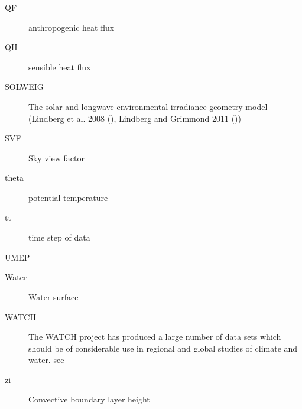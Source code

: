 \documentclass[letterpaper,10pt,english]{sphinxmanual}
\begin{document}
\begin{description}
\item[{QF}] \leavevmode{}\label{\detokenize{notation:term-qf}}
anthropogenic  heat flux

\item[{QH}] \leavevmode{}\label{\detokenize{notation:term-qh}}
sensible heat  flux

\item[{SOLWEIG}] \leavevmode{}\label{\detokenize{notation:term-solweig}}
The solar and longwave environmental irradiance geometry model
(Lindberg et al. 2008 \label{\detokenize{notation:id8}}{\hyperref[\detokenize{references:fl2008}]{\sphinxcrossref{{[}FL2008{]}}}} (),   Lindberg and Grimmond 2011 \label{\detokenize{notation:id9}}{\hyperref[\detokenize{references:fl2011}]{\sphinxcrossref{{[}FL2011{]}}}} ())

\item[{SVF}] \leavevmode{}\label{\detokenize{notation:term-svf}}
Sky view factor

\item[{theta}] \leavevmode{}\label{\detokenize{notation:term-theta}}
potential  temperature

\item[{tt}] \leavevmode{}\label{\detokenize{notation:term-tt}}
time step of data

\item[{UMEP}] \leavevmode{}\label{\detokenize{notation:term-umep}}

\item[{Water}] \leavevmode{}\label{\detokenize{notation:term-water}}
Water surface

\item[{WATCH}] \leavevmode{}\label{\detokenize{notation:term-watch}}
The WATCH project has produced a large number of data sets which should be of considerable use in regional and global studies of climate and water. see 

\item[{zi}] \leavevmode{}\label{\detokenize{notation:term-zi}}
Convective boundary layer height

\end{description}
\end{document}
